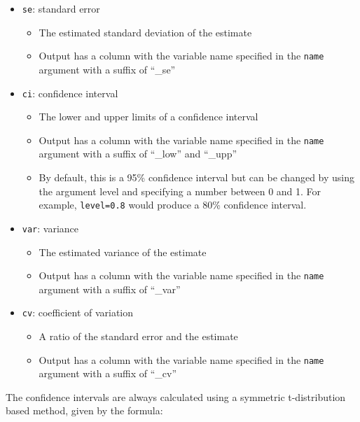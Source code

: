 \documentclass[
]{krantz}
\providecommand{\tightlist}{%
  \setlength{\itemsep}{0pt}\setlength{\parskip}{0pt}}
\begin{document}
\begin{itemize}
\tightlist
\item
  \texttt{se}: standard error

  \begin{itemize}
  \tightlist
  \item
    The estimated standard deviation of the estimate
  \item
    Output has a column with the variable name specified in the \texttt{name} argument with a suffix of ``\_se''
  \end{itemize}
\item
  \texttt{ci}: confidence interval

  \begin{itemize}
  \tightlist
  \item
    The lower and upper limits of a confidence interval
  \item
    Output has a column with the variable name specified in the \texttt{name} argument with a suffix of ``\_low'' and ``\_upp''
  \item
    By default, this is a 95\% confidence interval but can be changed by using the argument level and specifying a number between 0 and 1. For example, \texttt{level=0.8} would produce a 80\% confidence interval.
  \end{itemize}
\item
  \texttt{var}: variance

  \begin{itemize}
  \tightlist
  \item
    The estimated variance of the estimate
  \item
    Output has a column with the variable name specified in the \texttt{name} argument with a suffix of ``\_var''
  \end{itemize}
\item
  \texttt{cv}: coefficient of variation

  \begin{itemize}
  \tightlist
  \item
    A ratio of the standard error and the estimate
  \item
    Output has a column with the variable name specified in the \texttt{name} argument with a suffix of ``\_cv''
  \end{itemize}
\end{itemize}

The confidence intervals are always calculated using a symmetric t-distribution based method, given by the formula:
\end{document}
